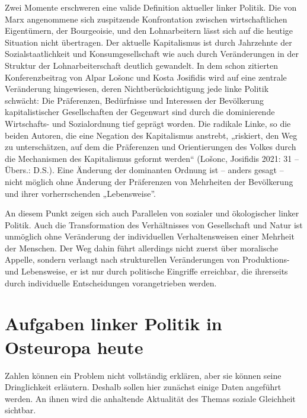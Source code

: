 \begin{multicols*}{2}
    Zwei Momente erschweren eine valide Definition aktueller linker Politik. Die von Marx angenommene sich zuspitzende Konfrontation zwischen wirtschaftlichen Eigentümern, der Bourgeoisie, und den Lohnarbeitern lässt sich auf die heutige Situation nicht übertragen. Der aktuelle Kapitalismus ist durch Jahrzehnte der Sozialstaatlichkeit und Konsumgesellschaft wie auch durch Veränderungen in der Struktur der Lohnarbeiterschaft deutlich gewandelt. In dem schon zitierten Konferenzbeitrag von Alpar Lošonc und Kosta Josifidis wird auf eine zentrale Veränderung hingewiesen, deren Nichtberücksichtigung jede linke Politik schwächt: Die Präferenzen, Bedürfnisse und Interessen der Bevölkerung kapitalistischer Gesellschaften der Gegenwart sind durch die dominierende Wirtschafts- und Sozialordnung tief geprägt worden. Die radikale Linke, so die beiden Autoren, die eine Negation des Kapitalismus anstrebt, „riskiert, den Weg zu unterschätzen, auf dem die Präferenzen und Orientierungen des Volkes durch die Mechanismen des Kapitalismus geformt werden“ (Lošonc, Josifidis 2021: 31 – Übers.: D.S.). Eine Änderung der dominanten Ordnung ist – anders gesagt – nicht möglich ohne Änderung der Präferenzen von Mehrheiten der Bevölkerung und ihrer vorherrschenden „Lebensweise”.

    An diesem Punkt zeigen sich auch Parallelen von sozialer und ökologischer linker Politik. Auch die Transformation des Verhältnisses von Gesellschaft und Natur ist unmöglich ohne Veränderung der individuellen Verhaltensweisen einer Mehrheit der Menschen. Der Weg dahin führt allerdings nicht zuerst über moralische Appelle, sondern verlangt nach strukturellen Veränderungen von Produktions- und Lebensweise, er ist nur durch politische Eingriffe erreichbar, die ihrerseits durch individuelle Entscheidungen vorangetrieben werden. 
    
\section{Aufgaben linker Politik in Osteuropa heute}

\noindent Zahlen können ein Problem nicht vollständig erklären, aber sie können seine Dringlichkeit erläutern. Deshalb sollen hier zunächst einige Daten angeführt werden. An ihnen wird die anhaltende Aktualität des Themas soziale Gleichheit sichtbar. 


\end{multicols*}
